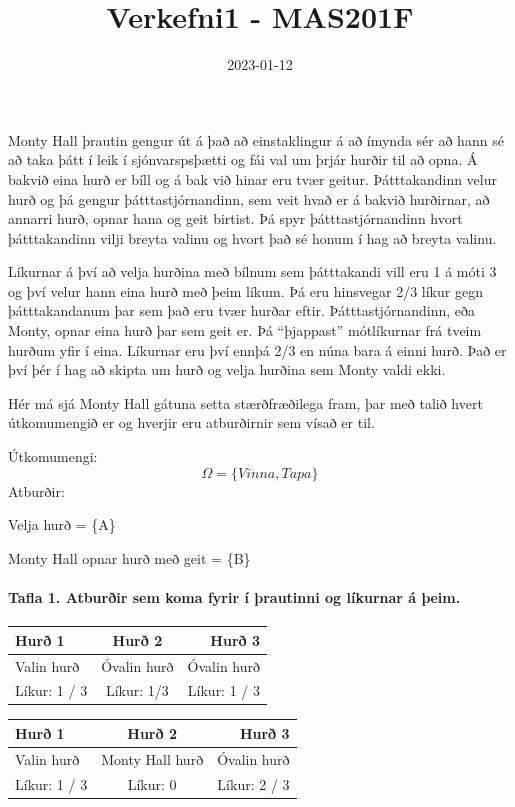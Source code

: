 \documentclass[
]{article}
\title{Verkefni1 - MAS201F}
\author{}
\date{\vspace{-2.5em}2023-01-12}
\begin{document}
\maketitle

Monty Hall þrautin gengur út á það að einstaklingur á að ímynda sér að
hann sé að taka þátt í leik í sjónvarspsþætti og fái val um þrjár hurðir
til að opna. Á bakvið eina hurð er bíll og á bak við hinar eru tvær
geitur. Þátttakandinn velur hurð og þá gengur þátttastjórnandinn, sem
veit hvað er á bakvið hurðirnar, að annarri hurð, opnar hana og geit
birtist. Þá spyr þátttastjórnandinn hvort þátttakandinn vilji breyta
valinu og hvort það sé honum í hag að breyta valinu.

Líkurnar á því að velja hurðina með bílnum sem þátttakandi vill eru 1 á
móti 3 og því velur hann eina hurð með þeim líkum. Þá eru hinsvegar 2/3
líkur gegn þátttakandanum þar sem það eru tvær hurðar eftir.
Þátttastjórnandinn, eða Monty, opnar eina hurð þar sem geit er. Þá
``þjappast'' mótlíkurnar frá tveim hurðum yfir í eina. Líkurnar eru því
ennþá 2/3 en núna bara á einni hurð. Það er því þér í hag að skipta um
hurð og velja hurðina sem Monty valdi ekki.

Hér má sjá Monty Hall gátuna setta stærðfræðilega fram, þar með talið
hvert útkomumengið er og hverjir eru atburðirnir sem vísað er til.

Útkomumengi: \[
\Omega = \{Vinna, Tapa\}
\] Atburðir:

Velja hurð = \{A\}

Monty Hall opnar hurð með geit = \{B\}

\hypertarget{tafla-1.-atburuxf0ir-sem-koma-fyrir-uxed-uxferautinni-og-luxedkurnar-uxe1-uxfeeim.}{%
\paragraph{Tafla 1. Atburðir sem koma fyrir í þrautinni og líkurnar á
þeim.}\label{tafla-1.-atburuxf0ir-sem-koma-fyrir-uxed-uxferautinni-og-luxedkurnar-uxe1-uxfeeim.}}

\begin{longtable}[]{@{}lcr@{}}
\toprule()
Hurð 1 & Hurð 2 & Hurð 3 \\
\midrule()
\endhead
Valin hurð & Óvalin hurð & Óvalin hurð \\
Líkur: 1 / 3 & Líkur: 1/3 & Líkur: 1 / 3 \\
\bottomrule()
\end{longtable}

\begin{longtable}[]{@{}lcr@{}}
\toprule()
Hurð 1 & Hurð 2 & Hurð 3 \\
\midrule()
\endhead
Valin hurð & Monty Hall hurð & Óvalin hurð \\
Líkur: 1 / 3 & Líkur: 0 & Líkur: 2 / 3 \\
\bottomrule()
\end{longtable}
\end{document}
